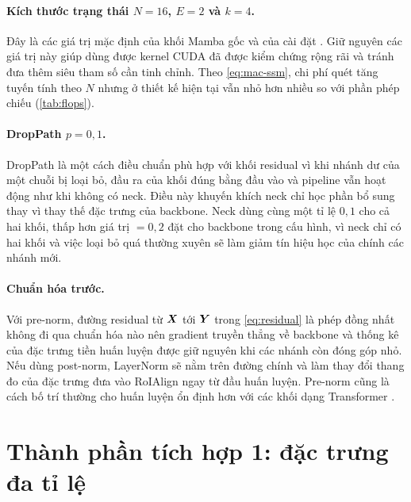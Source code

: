 \paragraph{Kích thước trạng thái $N = 16$, $E = 2$ và $k = 4$.} Đây là các giá trị mặc định của khối Mamba gốc \cite{gu2023mamba} và của cài đặt  \cite{chen2024videomambasuite}. Giữ nguyên các giá trị này giúp dùng được kernel CUDA đã được kiểm chứng rộng rãi và tránh đưa thêm siêu tham số cần tinh chỉnh. Theo \cref{eq:mac-ssm}, chi phí quét tăng tuyến tính theo $N$ nhưng ở thiết kế hiện tại vẫn nhỏ hơn nhiều so với phần phép chiếu (\cref{tab:flops}).

\paragraph{DropPath $p = 0{,}1$.} DropPath là một cách điều chuẩn phù hợp với khối residual vì khi nhánh dư của một chuỗi bị loại bỏ, đầu ra của khối đúng bằng đầu vào và pipeline vẫn hoạt động như khi không có neck. Điều này khuyến khích neck chỉ học phần bổ sung thay vì thay thế đặc trưng của backbone. Neck dùng cùng một tỉ lệ $0{,}1$ cho cả hai khối, thấp hơn giá trị  $= 0{,}2$ đặt cho backbone trong cấu hình, vì neck chỉ có hai khối và việc loại bỏ quá thường xuyên sẽ làm giảm tín hiệu học của chính các nhánh mới.

\paragraph{Chuẩn hóa trước.} Với pre-norm, đường residual từ $\bm{X}$ tới $\bm{Y}$ trong \cref{eq:residual} là phép đồng nhất không đi qua chuẩn hóa nào nên gradient truyền thẳng về backbone và thống kê của đặc trưng tiền huấn luyện được giữ nguyên khi các nhánh còn đóng góp nhỏ. Nếu dùng post-norm, LayerNorm sẽ nằm trên đường chính và làm thay đổi thang đo của đặc trưng đưa vào RoIAlign ngay từ đầu huấn luyện. Pre-norm cũng là cách bố trí thường cho huấn luyện ổn định hơn với các khối dạng Transformer \cite{xiong2020prenorm}.

\section{Thành phần tích hợp 1: đặc trưng đa tỉ lệ}
\label{sec:multiscale}

